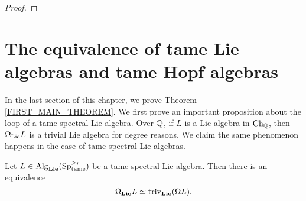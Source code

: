 \begin{proof}


\end{proof}

\section{The equivalence of tame Lie algebras and tame Hopf algebras}
\label{Proof of the first main Theorem}
In the last section of this chapter, we prove Theorem \ref{FIRST_MAIN_THEOREM}.
We first prove an important proposition about the loop of a tame spectral Lie algebra.
Over ${\mathbb{Q}}$, if $L$ is a Lie algebra in $\operatorname{Ch}_{{\mathbb{Q}}}$, then $\Omega_{\operatorname{Lie}}L$ is a trivial Lie algebra for degree reasons.
We claim the same phenomenon happens in the case of tame spectral Lie algebras.

\begin{proposition}
\label{Triviality of loop of an O-algebra}
	Let $L\in \operatorname{Alg}_{\mathbf{Lie}}(\operatorname{Sp}^{\geq r}_{\operatorname{\operatorname{tame}}}) $ be a tame spectral Lie algebra.
	Then there is an equivalence
	$$
	\Omega_{\mathbf{Lie}} L\simeq \operatorname{triv}_{\mathbf{Lie}}(\Omega L).
	$$ 
\end{proposition}

